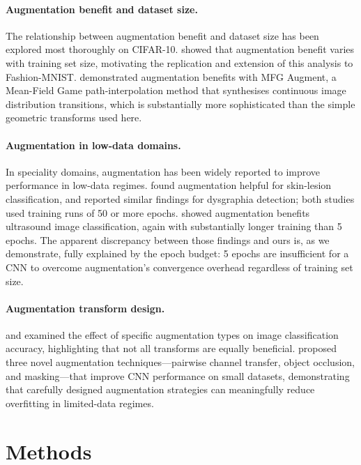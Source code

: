 \documentclass[11pt]{article}
\begin{document}
\paragraph{Augmentation benefit and dataset size.}
The relationship between augmentation benefit and dataset size has been explored
most thoroughly on CIFAR-10.
\citet{karada2020empirical} showed that augmentation benefit varies with training
set size, motivating the replication and extension of this analysis to
Fashion-MNIST.
\citet{kang2024game} demonstrated augmentation benefits with MFG Augment, a
Mean-Field Game path-interpolation method that synthesises continuous image
distribution transitions, which is substantially more sophisticated than the
simple geometric transforms used here.

\paragraph{Augmentation in low-data domains.}
In speciality domains, augmentation has been widely reported to improve
performance in low-data regimes.
\citet{pham2018deep} found augmentation helpful for skin-lesion classification,
and \citet{harun2024dysgraphia} reported similar findings for dysgraphia
detection; both studies used training runs of 50 or more epochs.
\citet{snider2023using} showed augmentation benefits ultrasound image
classification, again with substantially longer training than 5 epochs.
The apparent discrepancy between those findings and ours is, as we demonstrate,
fully explained by the epoch budget: 5 epochs are insufficient for a CNN to
overcome augmentation's convergence overhead regardless of training set size.

\paragraph{Augmentation transform design.}
\citet{poojary2021effect} and \citet{zhang2020circular} examined the effect of
specific augmentation types on image classification accuracy, highlighting
that not all transforms are equally beneficial.
\citet{kumar2025enhancing} proposed three novel augmentation techniques---pairwise
channel transfer, object occlusion, and masking---that improve CNN performance
on small datasets, demonstrating that carefully designed augmentation strategies
can meaningfully reduce overfitting in limited-data regimes.

\section{Methods}
\label{sec:methods}
\end{document}
